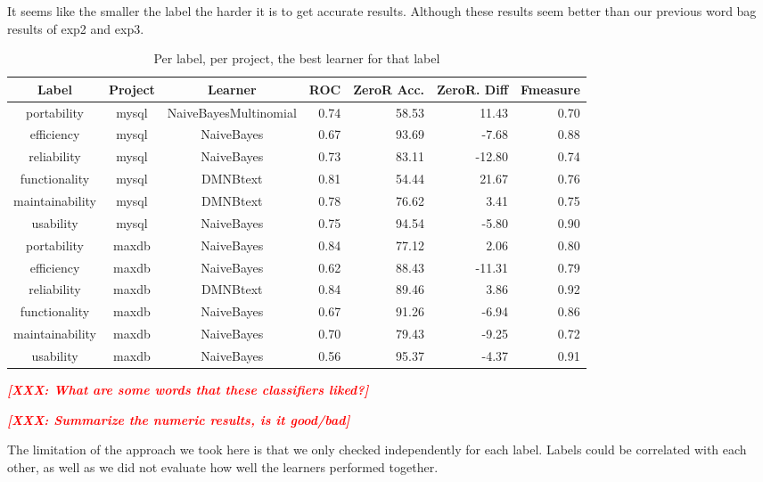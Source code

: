 \documentclass{acm_proc_article-sp}
\newcommand{\XXX}[1]{\textcolor{red}{{\it \textbf{[XXX: #1]}}}}
\begin{document}
It seems like the smaller the label the harder it is to get accurate results. Although these results seem better than our previous word bag results of \textsf{exp2} and \textsf{exp3}.


\begin{table}
\centering
\begin{tabular}{ccc|rrrr}
Label & Project & Learner & ROC & ZeroR Acc. & ZeroR. Diff & Fmeasure\\
\hline
portability &  mysql &  NaiveBayesMultinomial &  0.74 &  58.53 &  11.43 &  0.70  \\ 
efficiency &  mysql &  NaiveBayes &  0.67 &  93.69 &  -7.68 &  0.88 \\ 
reliability &  mysql &  NaiveBayes &  0.73 &  83.11 &  -12.80 &  0.74 \\ 
functionality &  mysql &  DMNBtext &  0.81 &  54.44 &  21.67 &  0.76 \\ 
maintainability &  mysql &  DMNBtext &  0.78 &  76.62 &  3.41 &  0.75 \\ 
usability &  mysql &  NaiveBayes &  0.75 &  94.54 &  -5.80 &  0.90  \\ 
 \hline 
portability &  maxdb &  NaiveBayes &  0.84 &  77.12 &  2.06 &  0.80 \\ 
efficiency &  maxdb &  NaiveBayes &  0.62 &  88.43 &  -11.31 &  0.79 \\ 
reliability &  maxdb &  DMNBtext &  0.84 &  89.46 &  3.86 &  0.92  \\ 
functionality &  maxdb &  NaiveBayes &  0.67 &  91.26 &  -6.94 &  0.86  \\ 
maintainability &  maxdb &  NaiveBayes &  0.70 &  79.43 &  -9.25 &  0.72  \\ 
usability &  maxdb &  NaiveBayes &  0.56 &  95.37 &  -4.37 &  0.91  \\ 
 \hline 
\end{tabular}
\caption{Per label, per project, the best learner for that label}
\label{tab:best-learner-per-tag}
\end{table}

\XXX{What are some words that these classifiers liked?}

\XXX{Summarize the numeric results, is it good/bad}

The limitation of the approach we took here is that we only checked independently for each label. Labels could be correlated with each other, as well as we did not evaluate how well the learners performed together.
\end{document}
